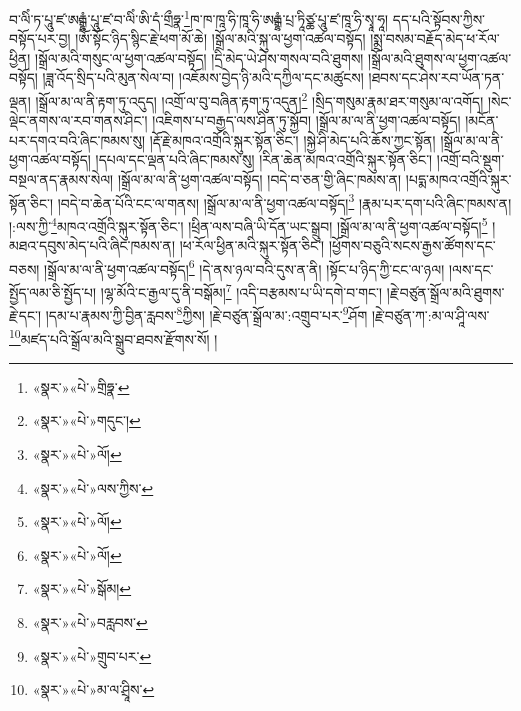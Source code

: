 བ་ལིཾ་ཏ་པཱུ་ཛ་ཨརྒྷཾ་པཱུ་ཛ་བ་ལིཾ་ཨི་དཾ་གྲྀཧྣ་\footnote{«སྣར་»«པེ་»གྲིཧྣ་}ཁ་ཁ་ཁཱ་ཧི་ཁཱ་ཧི་ཨརྒྷཾ་པྲ་ཏཱིཙྪ་པཱུ་ཛ་ཁཱ་ཧི་སྭཱ་ཧཱ། དད་པའི་སྟོབས་ཀྱིས་བསྟོད་པར་བྱ། །ཨོཾ་སྟོང་ཉིད་སྙིང་རྗེ་ཕག་མོ་ཆེ། །སྒྲོལ་མའི་སྐུ་ལ་ཕྱག་འཚལ་བསྟོད། །སྨྲ་བསམ་བརྗོད་མེད་ཕ་རོལ་ཕྱིན། །སྒྲོལ་མའི་གསུང་ལ་ཕྱག་འཚལ་བསྟོད། །དྲི་མེད་ཡེ་ཤེས་གསལ་བའི་ཐུགས། །སྒྲོལ་མའི་ཐུགས་ལ་ཕྱག་འཚལ་བསྟོད། །ཟླ་འོད་སྲིད་པའི་མུན་སེལ་བ། །འཇོམས་བྱེད་ཉི་མའི་དཀྱིལ་དང་མཚུངས། །ཐབས་དང་ཤེས་རབ་ཡོན་ཏན་ལྡན། །སྒྲོལ་མ་ལ་ནི་རྟག་ཏུ་འདུད། །འགྲོ་ལ་བུ་བཞིན་རྟག་ཏུ་འདུན།\footnote{«སྣར་»«པེ་»གདུང་།} །སྲིད་གསུམ་རྣམ་ཐར་གསུམ་ལ་འགོད། །སེང་ལྡེང་ནགས་ལ་རབ་གནས་ཤིང་། །འཇིགས་པ་བརྒྱད་ལས་ཤིན་ཏུ་སྐྱོབ། །སྒྲོལ་མ་ལ་ནི་ཕྱག་འཚལ་བསྟོད། །མངོན་པར་དགའ་བའི་ཞིང་ཁམས་སུ། །རྡོ་རྗེ་མཁའ་འགྲོའི་སྐུར་སྟོན་ཅིང་། །སྐྱེ་ཤི་མེད་པའི་ཆོས་ཀྱང་སྟོན། །སྒྲོལ་མ་ལ་ནི་ཕྱག་འཚལ་བསྟོད། །དཔལ་དང་ལྡན་པའི་ཞིང་ཁམས་སུ། །རིན་ཆེན་མཁའ་འགྲོའི་སྐུར་སྟོན་ཅིང་། །འགྲོ་བའི་སྡུག་བསྔལ་ནད་རྣམས་སེལ། །སྒྲོལ་མ་ལ་ནི་ཕྱག་འཚལ་བསྟོད། །བདེ་བ་ཅན་གྱི་ཞིང་ཁམས་ན། །པདྨ་མཁའ་འགྲོའི་སྐུར་སྟོན་ཅིང་། །བདེ་བ་ཆེན་པོའི་ངང་ལ་གནས། །སྒྲོལ་མ་ལ་ནི་ཕྱག་འཚལ་བསྟོད།\footnote{«སྣར་»«པེ་»ལོ།} །རྣམ་པར་དག་པའི་ཞིང་ཁམས་ན། །:ལས་ཀྱི་\footnote{«སྣར་»«པེ་»ལས་ཀྱིས་}མཁའ་འགྲོའི་སྐུར་སྟོན་ཅིང་། །ཕྲིན་ལས་བཞི་ཡི་དོན་ཡང་སྒྲུབ། །སྒྲོལ་མ་ལ་ནི་ཕྱག་འཚལ་བསྟོད།\footnote{«སྣར་»«པེ་»ལོ།} །མཐའ་དབུས་མེད་པའི་ཞིང་ཁམས་ན། །ཕ་རོལ་ཕྱིན་མའི་སྐུར་སྟོན་ཅིང་། །ཕྱོགས་བཅུའི་སངས་རྒྱས་ཚོགས་དང་བཅས། །སྒྲོལ་མ་ལ་ནི་ཕྱག་འཚལ་བསྟོད།\footnote{«སྣར་»«པེ་»ལོ།} །དེ་ནས་ཉལ་བའི་དུས་ན་ནི། །སྟོང་པ་ཉིད་ཀྱི་ངང་ལ་ཉལ། །ལས་དང་སྤྱོད་ལམ་ཅི་སྤྱོད་པ། །ལྷ་མོའི་ང་རྒྱལ་དུ་ནི་བསྒོམ།\footnote{«སྣར་»«པེ་»སྒོམ།} །འདི་བརྩམས་པ་ཡི་དགེ་བ་གང་། །རྗེ་བཙུན་སྒྲོལ་མའི་ཐུགས་རྗེ་དང་། །དམ་པ་རྣམས་ཀྱི་བྱིན་རླབས་\footnote{«སྣར་»«པེ་»བརླབས་}ཀྱིས། །རྗེ་བཙུན་སྒྲོལ་མ་:འགྲུབ་པར་\footnote{«སྣར་»«པེ་»གྲུབ་པར་}ཤོག །རྗེ་བཙུན་ཀ་:མ་ལ་ཤཱི་ལས་\footnote{«སྣར་»«པེ་»མ་ལ་ཤྲཱིས་}མཛད་པའི་སྒྲོལ་མའི་སྒྲུབ་ཐབས་རྫོགས་སོ། ། 